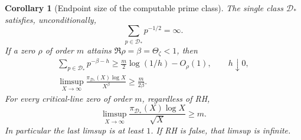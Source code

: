 \documentclass[11pt]{article}
\newtheorem{corollary}[theorem]{Corollary}
\theoremstyle{definition}
\begin{document}
\begin{corollary}[Endpoint size of the computable prime class]
\label{cor:computed-prime-endpoint-size}
The single class $\mathcal D_*$ satisfies, unconditionally,
\begin{equation}
                   \sum_{p\in\mathcal D_*}p^{-1/2}=\infty .
 \label{eq:computed-prime-root-divergence}
\end{equation}
If a zero $\rho$ of order $m$ attains
$\Re\rho=\beta=\Theta_\zeta<1$, then
\begin{equation}
 \begin{gathered}
 \sum_{p\in\mathcal D_*}p^{-\beta-h}
                \ge\frac m2\log(1/h)-O_\rho(1),\qquad h\downarrow0,\\
 \limsup_{X\to\infty}
        \frac{\pi_{\mathcal D_*}(X)\log X}{X^\beta}
                                  \ge\frac{m}{2\beta}.
 \end{gathered}
 \label{eq:computed-prime-rightmost-zero-size}
\end{equation}
For every critical-line zero of order $m$, regardless of RH,
\begin{equation}
 \limsup_{X\to\infty}
      \frac{\pi_{\mathcal D_*}(X)\log X}{\sqrt X}\ge m .
 \label{eq:computed-prime-unconditional-root-size}
\end{equation}
In particular the last limsup is at least $1$.
If RH is false, that limsup is infinite.
\end{corollary}
\end{document}
